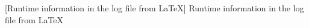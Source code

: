 [Runtime information in the log file from LaTeX]{%
 Runtime information in the log file from LaTeX
}%
